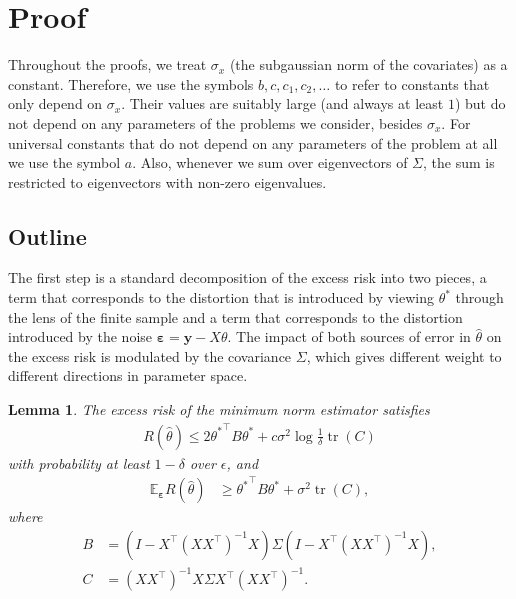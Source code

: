 \documentclass[11pt,notitlepage]{article}
\newcommand\E {\mathbb{E}}
\newcommand\Expect{\E}
\newcommand\bs {\boldsymbol}
\newcommand\eps {\varepsilon}
\newcommand\tr {\ensuremath{\operatorname{\mathrm{tr}}}}
\newtheorem{lemma}[theorem]{Lemma}
\begin{document}
\section{Proof}\label{section:proof}

Throughout the proofs, we treat $\sigma_x$ (the subgaussian norm of
the covariates) as a constant. Therefore, we use the symbols
$b,c,c_1,c_2,\ldots$ to refer to constants that only depend on
$\sigma_x$. Their values are suitably large (and always at
least $1$) but do not depend on any parameters of the problems we
consider, besides $\sigma_x$. For universal constants that do not depend on any parameters of the problem at all we use the symbol $a$. Also, whenever we sum over eigenvectors of 
$\Sigma$, the sum is restricted to eigenvectors with non-zero
eigenvalues.

\subsection*{Outline}

The first step is a standard decomposition of the excess risk into
two pieces, a term that corresponds to the distortion
that is introduced by viewing $\theta^*$ through the lens of the
finite sample and a term that corresponds to the
distortion introduced by the noise $\bs{\eps}=\bs{y}-X\theta$.
The impact of both sources of error in $\hat\theta$ on
the excess risk is modulated by the covariance $\Sigma$, which
gives different weight to different directions in parameter space.

\begin{lemma}\label{lemma:bv}
  The excess risk of the minimum norm estimator satisfies
    \begin{align*}
      R(\hat\theta)
        \leq 2{\theta^\ast}^\top B \theta^\ast
        + c\sigma^2\log\frac{1}{\delta} \tr(C)
    \end{align*}
  with probability at least $1-\delta$ over $\epsilon$,
  and
    \begin{align*}
      \Expect_{\bs{\eps}} R(\hat\theta)
        & \geq {\theta^\ast}^\top B \theta^\ast + \sigma^2 \tr(C),
    \end{align*}
  where
    \begin{align*}
      B & = \left(I - X^\top \left(X X^\top \right)^{-1}X\right)
          \Sigma\left(I - X^\top \left(X X^\top \right)^{-1}X\right), \\
      C & = \left(X X^\top \right)^{-1}X\Sigma X^\top \left(X X^\top \right)^{-1}.
    \end{align*}
\end{lemma}
\end{document}
